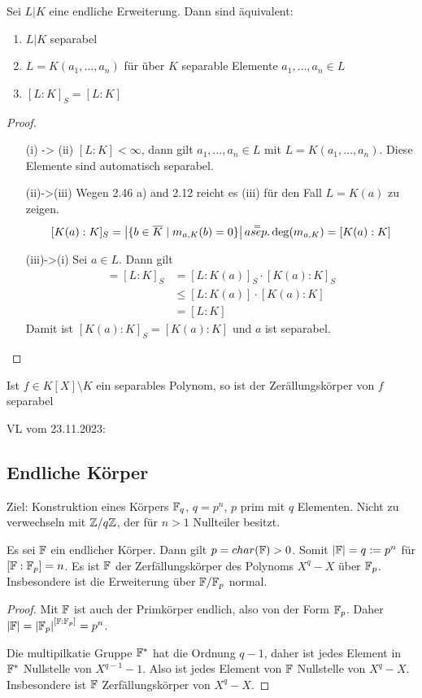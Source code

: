 \documentclass[../main.tex]{subfiles}
\begin{document}
\begin{theorem}
    Sei $L|K$ eine endliche Erweiterung. Dann sind äquivalent:
    \begin{enumerate} %
        \item $L|K$ separabel
        \item $L=K(a_1, \dots, a_n)$ für über $K$ separable Elemente $a_1, \dots, a_n \in L$
        \item $[L:K]_S = [L:K]$
    \end{enumerate}
\end{theorem}
\begin{proof}
    \begin{enumerate}
        \item[(i) -> (ii)] $[L:K] < \infty$, dann gilt $a_1, \dots, a_n \in L$ mit $L=K(a_1, \dots, a_n)$. Diese Elemente sind automatisch separabel.
        \item[(ii)->(iii)] Wegen 2.46 a) and 2.12 reicht es (iii) für den Fall $L=K(a)$ zu zeigen.
        $$[K(a):K]_S=\left\vert \{b\in \overline{K}\mid m_{a,K}(b)=0\} \right\vert \overset{=}{a sep.}\deg(m_{a,K}) = [K(a):K]$$
        \item[(iii)->(i)] Sei $a\in L$. Dann gilt
        \begin{align*}
            [L:K] = [L:K]_S &= [L:K(a)]_S \cdot [K(a):K]_S\\
            &\leq [L:K(a)] \cdot [K(a):K]\\
            &= [L:K]
        \end{align*}
        Damit ist $[K(a):K]_S = [K(a):K]$ und $a$ ist separabel.
    \end{enumerate}
\end{proof}
\begin{corollary}
    Ist $f\in K[X]\setminus K$ ein separables Polynom, so ist der Zerällungskörper von $f$ separabel
\end{corollary}


\begin{flushright}
VL vom 23.11.2023:
\end{flushright}
\subsection{Endliche Körper}
Ziel: Konstruktion eines Körpers $\mathbb{F}_q$, $q=p^n$, $p$ prim mit $q$ Elementen. Nicht zu verwechseln mit $\mathbb{Z}/q\mathbb{Z}$, der für $n>1$ Nullteiler besitzt.
\begin{lemma}
    Es sei $\mathbb{F}$ ein endlicher Körper. Dann gilt $p=char(\mathbb{F})>0$. Somit $\left\vert \mathbb{F} \right\vert = q := p^n$ für $[\mathbb{F}:\mathbb{F}_p] = n$. Es ist $\mathbb{F}$ der Zerfällungskörper des Polynoms $X^q-X$ über $\mathbb{F}_p$. Insbesondere ist die Erweiterung über $\mathbb{F}/\mathbb{F}_p$ normal.
\end{lemma}
\begin{proof}
    Mit $\mathbb{F}$ ist auch der Primkörper endlich, also von der Form $\mathbb{F}_p$. Daher $\left\vert \mathbb{F} \right\vert = \left\vert \mathbb{F}_p \right\vert^{[\mathbb{F}:\mathbb{F}_p]} = p^n$.

    Die multipilkatie Gruppe $\mathbb{F}^*$ hat die Ordnung $q-1$, daher ist jedes Element in $\mathbb{F}^*$ Nullstelle von $X^{q-1}-1$. Also ist jedes Element von $\mathbb{F}$ Nullstelle von $X^q-X$.
    Insbesondere ist $\mathbb{F}$ Zerfällungskörper von $X^q-X$.
\end{proof}
\end{document}
